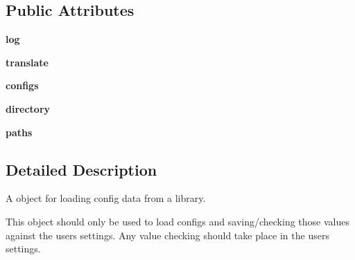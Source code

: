 \subsection*{Public Attributes}
\begin{DoxyCompactItemize}
\item 
\hypertarget{classcommotion__client_1_1utils_1_1extension__manager_1_1ConfigManager_aaf53690e921a06e6b522489b884d184a}{{\bfseries log}}\label{classcommotion__client_1_1utils_1_1extension__manager_1_1ConfigManager_aaf53690e921a06e6b522489b884d184a}

\item 
\hypertarget{classcommotion__client_1_1utils_1_1extension__manager_1_1ConfigManager_aa0ce09aefdd36656f0a1abfad14e9ff1}{{\bfseries translate}}\label{classcommotion__client_1_1utils_1_1extension__manager_1_1ConfigManager_aa0ce09aefdd36656f0a1abfad14e9ff1}

\item 
\hypertarget{classcommotion__client_1_1utils_1_1extension__manager_1_1ConfigManager_a13f7fe6d2a2802b7a74b635aa610ece7}{{\bfseries configs}}\label{classcommotion__client_1_1utils_1_1extension__manager_1_1ConfigManager_a13f7fe6d2a2802b7a74b635aa610ece7}

\item 
\hypertarget{classcommotion__client_1_1utils_1_1extension__manager_1_1ConfigManager_a26693e1c1001c0967fe11876e5b37327}{{\bfseries directory}}\label{classcommotion__client_1_1utils_1_1extension__manager_1_1ConfigManager_a26693e1c1001c0967fe11876e5b37327}

\item 
\hypertarget{classcommotion__client_1_1utils_1_1extension__manager_1_1ConfigManager_a0e2fabb5da2d9be8b5c12aed0e8f3661}{{\bfseries paths}}\label{classcommotion__client_1_1utils_1_1extension__manager_1_1ConfigManager_a0e2fabb5da2d9be8b5c12aed0e8f3661}

\end{DoxyCompactItemize}


\subsection{Detailed Description}
\begin{DoxyVerb}A object for loading config data from a library.

This object should only be used to load configs and saving/checking those values against the users settings. Any value checking should take place in the users settings.
\end{DoxyVerb}
 

